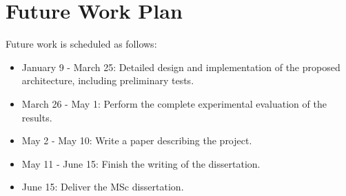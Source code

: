 \section{Future Work Plan}
\label{sec:workplan}

Future work is scheduled as follows:

\begin{itemize}
	\item January 9 - March 25: Detailed design and implementation of the
	proposed architecture, including preliminary tests.
	\item March 26 - May 1: Perform the complete experimental evaluation
	of the results.
	\item May 2 - May 10: Write a paper describing the project.
	\item May 11 - June 15: Finish the writing of the dissertation.
	\item June 15: Deliver the MSc dissertation.
\end{itemize}

%			
%			
%			
%			

